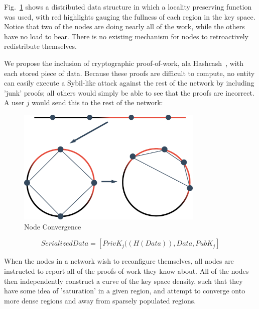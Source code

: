 \documentclass[10pt]{IEEEtran}
\begin{document}
\par Fig.~\ref{fig_kSpaceUneven} shows a distributed data structure in which a locality preserving function was used, with red highlights gauging the fullness of each region in the key space. Notice that two of the nodes are doing nearly all of the work, while the others have no load to bear. There is no existing mechanism for nodes to retroactively redistribute themselves.


\par We propose the inclusion of cryptographic proof-of-work, ala Hashcash~\cite{Back:2002vq}, with each stored piece of data. Because these proofs are difficult to compute, no entity can easily execute a Sybil-like attack against the rest of the network by including 'junk' proofs; all others would simply be able to see that the proofs are incorrect. A user $j$ would send this to the rest of the network:

\begin{figure}[!t]
\centering
\includegraphics[width=3.5in]{unevenDistro}
\caption{Node Convergence}
\label{fig_kSpaceUneven}
\end{figure}

\begin{equation} \label{eq:proof}
SerializedData = [PrivK_{j}((H(Data)), Data, PubK_{j}]
\end{equation}

\par When the nodes in a network wish to reconfigure themselves, all nodes are instructed to report all of the proofs-of-work they know about. All of the nodes then independently construct a curve of the key space density, such that they have some idea of 'saturation' in a given region, and attempt to converge onto more dense regions and away from sparsely populated regions.
\end{document}
